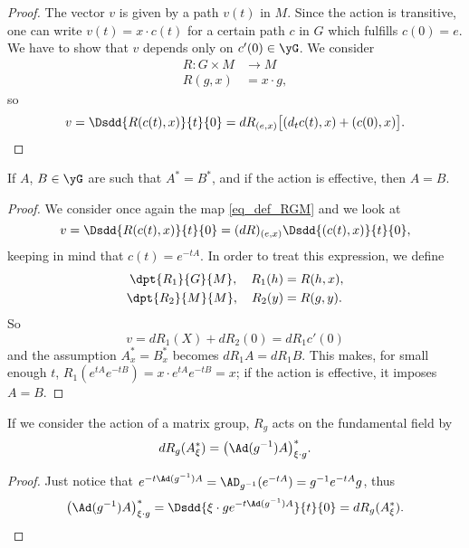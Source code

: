 \begin{proof}
The vector $v$ is given by a path $v(t)$ in $M$. Since the action is transitive, one can write $v(t)=x\cdot c(t)$ for a certain path $c$ in $G$ which fulfills $c(0)=e$. We have to show that $v$ depends only on $c'(0)\in\yG$. We consider 
\begin{equation}  \label{eq_def_RGM}
\begin{aligned}
 R\colon G\times M&\to M \\ 
R(g,x)&= x\cdot g,
\end{aligned}
\end{equation}
so
\begin{equation}\label{eq:v_Rc}
   v=\Dsdd{ R(c(t),x) }{t}{0}=dR_{(e,x)}\big[  (d_tc(t),x)+(c(0),x)   \big].
\end{equation}

\end{proof}



\begin{lemma}
If $A$, $B\in\yG$ are such that $A^*=B^*$, and if the action is effective, then $A=B$.
\label{lem:As_Bs_A_B}
\end{lemma}

\begin{proof}
 We consider once again the map \eqref{eq_def_RGM} and we look at 
\[
  v=\Dsdd{ R(c(t),x) }{t}{0}
   =(dR)_{(e,x)}\Dsdd{ (c(t),x) }{t}{0},
\]
keeping in mind that $c(t)=e^{-tA}$. In order to treat this expression, we define
\begin{subequations}
\begin{align}
  \dpt{R_1}{G}{M},\quad  R_1(h)&=R(h,x),\\
  \dpt{R_2}{M}{M},\quad  R_2(y)&=R(g,y).
\end{align}
\end{subequations}
So
\[
  v=dR_1(X)+dR_2(0)=dR_1c'(0)
\]
and the assumption $A^*_x=B^*_x$ becomes $dR_1 A=dR_1 B$. This makes, for small enough $t$, $R_1(e^{tA}e^{-tB})=x\cdot e^{tA}e^{-tB}=x$; if the action is effective, it imposes $A=B$.
\end{proof}

\begin{lemma}
If we consider the action of a matrix group, $R_g$ acts on the fundamental field by
\[
  dR_g(A^*_{\xi})=\big( \Ad(g^{-1})A \big)^*_{\xi\cdot g}.
\]
\label{lem:dRgAstar}
\end{lemma}

\begin{proof}
Just notice that $e^{-t\Ad(g^{-1})A}=\AD_{g^{-1}}(e^{-tA})=g^{-1} e^{-tA}g$, thus
\begin{equation}
  \big( \Ad(g^{-1})A \big)^*_{\xi\cdot g}=\Dsdd{ \xi\cdot ge^{-t\Ad(g^{-1})A} }{t}{0}=dR_g(A^*_{\xi}).
\end{equation}
\end{proof}

